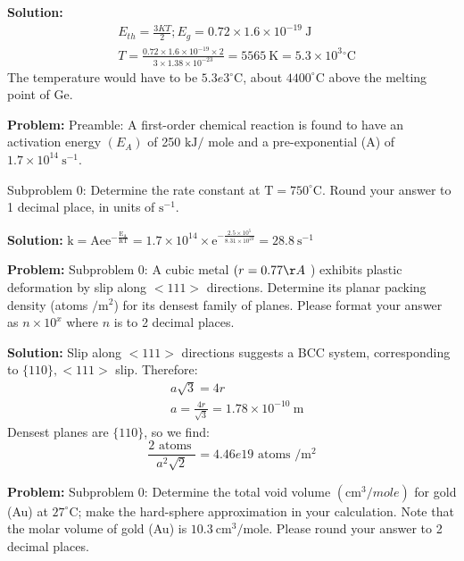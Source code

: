 \documentclass[10pt]{article}
\begin{document}
\textbf{Solution:}
\[
\begin{aligned}
&E_{t h}=\frac{3 K T}{2} ; E_{g}=0.72 \times 1.6 \times 10^{-19} \mathrm{~J} \\
&T=\frac{0.72 \times 1.6 \times 10^{-19} \times 2}{3 \times 1.38 \times 10^{-23}}=5565 \mathrm{~K}=5.3 \times 10^{3}{ }^{\circ} \mathrm{C}
\end{aligned}
\]
The temperature would have to be $\boxed{5.3e3}{ }^{\circ} \mathrm{C}$, about $4400^{\circ} \mathrm{C}$ above the melting point of Ge.


\textbf{Problem:}
Preamble: A first-order chemical reaction is found to have an activation energy $\left(E_{A}\right)$ of 250 $\mathrm{kJ} /$ mole and a pre-exponential (A) of $1.7 \times 10^{14} \mathrm{~s}^{-1}$.

Subproblem 0: Determine the rate constant at $\mathrm{T}=750^{\circ} \mathrm{C}$. Round your answer to 1 decimal place, in units of $\mathrm{s}^{-1}$.


\textbf{Solution:}
$\mathrm{k}=\mathrm{Ae} \mathrm{e}^{-\frac{\mathrm{E}_{\mathrm{A}}}{\mathrm{RT}}}=1.7 \times 10^{14} \times \mathrm{e}^{-\frac{2.5 \times 10^{5}}{8.31 \times 10^{23}}}= \boxed{28.8} \mathrm{~s}^{-1}$


\textbf{Problem:}
Subproblem 0: A cubic metal $(r=0.77 \AA$ ) exhibits plastic deformation by slip along $<111>$ directions. Determine its planar packing density (atoms $/ \mathrm{m}^{2}$) for its densest family of planes. Please format your answer as $n \times 10^x$ where $n$ is to 2 decimal places.


\textbf{Solution:}
Slip along $<111>$ directions suggests a BCC system, corresponding to $\{110\},<111>$ slip. Therefore:
\[
\begin{aligned}
&a \sqrt{3}=4 r \\
&a=\frac{4 r}{\sqrt{3}}=1.78 \times 10^{-10} \mathrm{~m}
\end{aligned}
\]
Densest planes are $\{110\}$, so we find:
\[
\frac{2 \text { atoms }}{a^{2} \sqrt{2}}=\boxed{4.46e19} \text { atoms } / \mathrm{m}^{2}
\]


\textbf{Problem:}
Subproblem 0: Determine the total void volume $(\mathrm{cm}^{3} / mole)$ for gold (Au) at $27^{\circ} \mathrm{C}$; make the hard-sphere approximation in your calculation. Note that the molar volume of gold (Au) is $10.3 \mathrm{~cm}^{3} / \mathrm{mole}$. Please round your answer to 2 decimal places.
\end{document}

